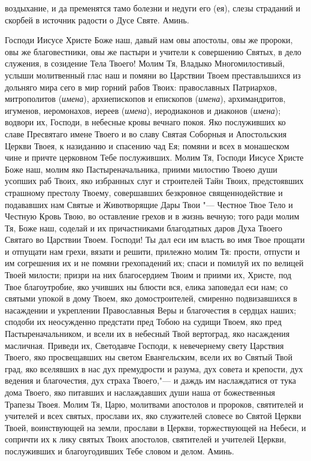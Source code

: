 \begin{mymulticols}
воздыхание, и да пременятся тамо болезни и недуги его (ея), слезы страданий и скорбей в источник радости о Дусе Святе. Аминь. 

\end{mymulticols}

\mychapterending


\begin{mymulticols}
 


Господи Иисусе Христе Боже наш, давый нам овы апостолы, овы же пророки, овы же благовестники, овы же пастыри и учители к совершению Святых, в дело служения, в созидение Тела Твоего! Молим Тя, Владыко Многомилостивый, услыши молитвенный глас наш и помяни во Царствии Твоем преставльшихся из дольняго мира сего в мир горний рабов Твоих: православных Патриархов, митрополитов ({\itshape имена}), архиепископов и епископов ({\itshape имена}), архимандритов, игуменов, иеромонахов, иереев ({\itshape имена}), иеродиаконов и диаконов ({\itshape имена}); водвори их, Господи, в небесные кровы вечнаго покоя. Яко послуживших ко славе Пресвятаго имене Твоего и во славу Святая Соборныя и Апостольския Церкви Твоея, к назиданию и спасению чад Ея; помяни и всех в монашеском чине и причте церковном Тебе послуживших. Молим Тя, Господи Иисусе Христе Боже наш, молим яко Пастыреначальника, приими милостию Твоею души усопших раб Твоих, яко избранных слуг и строителей Тайн Твоих, предстоявших страшному престолу Твоему, совершавших безкровное священнодействие и подававших нам Святые и Животворящие Дары Твои "--- Честное Твое Тело и Честную Кровь Твою, во оставление грехов и в жизнь вечную; того ради молим Тя, Боже наш, соделай и их причастниками благодатных даров Духа Твоего Святаго во Царствии Твоем. Господи! Ты дал еси им власть во имя Твое прощати и отпущати нам грехи, вязати и решити, прилежно молим Тя: прости, отпусти и им согрешения их и не помяни грехопадений их; спаси и помилуй их по велицей Твоей милости; призри на них благосердием Твоим и приими их, Христе, под Твое благоутробие, яко учивших ны блюсти вся, елика заповедал еси нам; со святыми упокой в дому Твоем, яко домостроителей, смиренно подвизавшихся в насаждении и укреплении Православныя Веры и благочестия в сердцах наших; сподоби их неосужденно предстати пред Тобою на судищи Твоем, яко пред Пастыреначальником, и всели их в небесный Твой вертоград, яко насаждения масличная. Приведи их, Светодавче Господи, к невечернему свету Царствия Твоего, яко просвещавших ны светом Евангельским, всели их во Святый Твой град, яко вселявших в нас дух премудрости и разума, дух совета и крепости, дух ведения и благочестия, дух страха Твоего,"--- и даждь им наслаждатися от тука дома Твоего, яко питавших и наслаждавших души наша от божественныя Трапезы Твоея. Молим Тя, Царю, молитвами апостолов и пророков, святителей и учителей и всех святых, прослави их, яко служителей словесе во Святой Церкви Твоей, воинствующей на земли, прослави в Церкви, торжествующей на Небеси, и сопричти их к лику святых Твоих апостолов, святителей и учителей Церкви, послуживших и благоугодивших Тебе словом и делом. Аминь. 
\longpage[2]{}


\end{mymulticols}

